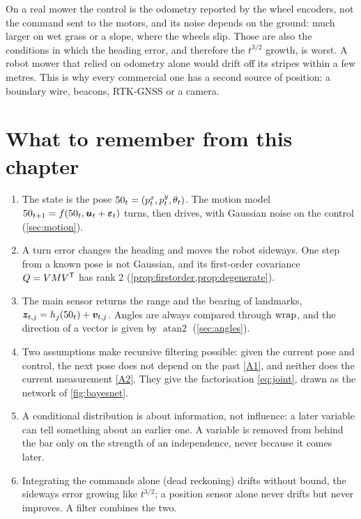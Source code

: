 \begin{mower}
On a real mower the control is the odometry reported by the wheel
encoders, not the command sent to the motors, and its noise depends on
the ground: much larger on wet grass or a slope, where the wheels slip.
Those are also the conditions in which the heading error, and therefore
the $t^{3/2}$ growth, is worst. A robot mower that relied on odometry
alone would drift off its stripes within a few metres. This is why every
commercial one has a second source of position: a boundary wire, beacons,
RTK-GNSS or a camera.
\end{mower}

\section*{What to remember from this chapter}

\begin{enumerate}[nosep]
  \item The state is the pose $50_t=(p^x_t,p^y_t,\theta_t)$. The motion
    model $50_{t+1}=f(50_t,\bm{u}_t+\bm{\varepsilon}_t)$ turns, then drives, with
    Gaussian noise on the control (\cref{sec:motion}).
  \item A turn error changes the heading and moves the robot sideways. One
    step from a known pose is not Gaussian, and its first-order covariance
    $Q=VMV^{\mathsf{T}}$ has rank $2$ (\cref{prop:firstorder,prop:degenerate}).
  \item The main sensor returns the range and the bearing of landmarks,
    $\bm{z}_{t,j}=h_j(50_t)+\bm{v}_{t,j}$. Angles are always compared through
    $\operatorname{wrap}$, and the direction of a vector is given by
    $\operatorname{atan2}$ (\cref{sec:angles}).
  \item Two assumptions make recursive filtering possible: given the
    current pose and control, the next pose does not depend on the past
\ref{A1}, and
    neither does the current measurement \ref{A2}. They give the
    factorisation \eqref{eq:joint}, drawn as the network of
    \cref{fig:bayesnet}.
  \item A conditional distribution is about information, not influence: a
    later variable can tell something about an earlier one. A variable is
    removed from behind the bar only on the strength of an independence,
    never because it comes later.
  \item Integrating the commands alone (dead reckoning) drifts without
    bound, the sideways error growing like $t^{3/2}$; a position sensor
    alone never drifts but never improves. A filter combines the two.
\end{enumerate}

